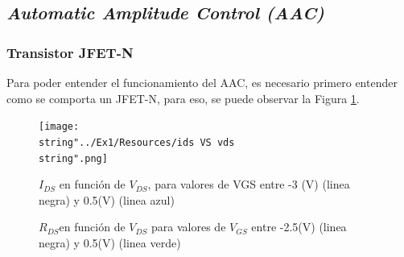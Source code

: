 \subsection{\emph{Automatic Amplitude Control (AAC)\label{subsec:Automatic-Amplitude-Control}}}

\subsubsection{Transistor JFET-N}

Para poder entender el funcionamiento del AAC, es necesario primero
entender como se comporta un JFET-N, para eso, se puede observar la
Figura \ref{1_4}.

\begin{figure}[h]
\begin{centering}
\texttt{[image: \\string"../Ex1/Resources/ids VS vds\\string".png]}
\par\end{centering}
\caption{$I_{DS}$ en función de $V_{DS}$, para valores de VGS entre -3 (V)
(linea negra) y 0.5(V) (linea azul) }
\label{1_4}

\end{figure}

\begin{figure}[h]
\begin{centering}
\par\end{centering}
\caption{$R_{DS}$en función de $V_{DS}$ para valores de $V_{GS}$ entre -2.5(V)
(linea negra) y 0.5(V) (linea verde)}
\label{1_5}

\end{figure}

